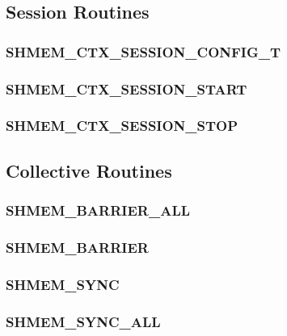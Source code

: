 \documentclass[10pt,oneside]{book}
\begin{document}
\subsection{Session Routines}\label{subsec:sessions}


\subsubsection{\textbf{SHMEM\_CTX\_SESSION\_CONFIG\_T}}\label{subsec:shmem_ctx_session_config_t}


\subsubsection{\textbf{SHMEM\_CTX\_SESSION\_START}}\label{subsec:shmem_ctx_session_start}


\subsubsection{\textbf{SHMEM\_CTX\_SESSION\_STOP}}\label{subsec:shmem_ctx_session_stop}



\subsection{Collective Routines}\label{subsec:coll}


\subsubsection{\textbf{SHMEM\_BARRIER\_ALL}}\label{subsec:shmem_barrier_all}


\subsubsection{\textbf{SHMEM\_BARRIER}}\label{subsec:shmem_barrier}


\subsubsection{\textbf{SHMEM\_SYNC}}\label{subsec:shmem_sync}


\subsubsection{\textbf{SHMEM\_SYNC\_ALL}}\label{subsec:shmem_sync_all}

\end{document}
